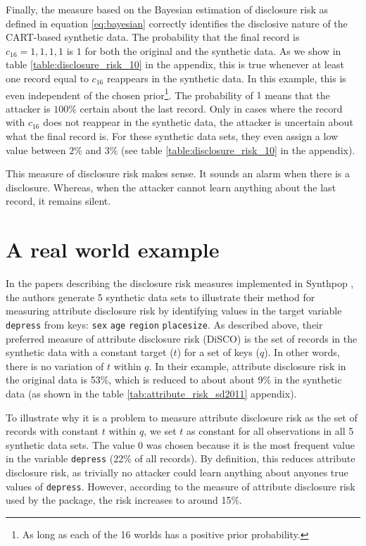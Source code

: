\documentclass[a4paper,11pt]{style/uneceart}
\begin{document}
Finally, the measure based on the Bayesian estimation of disclosure risk as defined in equation \ref{eq:bayesian} correctly identifies the disclosive nature of the CART-based synthetic data. The probability that the final record is $c_{16} = 1, 1, 1, 1$ is $1$ for both the original and the synthetic data. As we show in table \ref{table:disclosure_risk_10} in the appendix, this is true whenever at least one record equal to $c_{16}$ reappears in the synthetic data. In this example, this is even independent of the chosen prior\footnote{As long as each of the 16 worlds has a positive prior probability.}. The probability of $1$ means that the attacker is $100\%$ certain about the last record. Only in cases where the record with $c_{16}$ does not reappear in the synthetic data, the attacker is uncertain about what the final record is. For these synthetic data sets, they even assign a low value between $2\%$ and $3\%$ (see table \ref{table:disclosure_risk_10} in the appendix). 

This measure of disclosure risk makes sense. It sounds an alarm when there is a disclosure. Whereas, when the attacker cannot learn anything about the last record, it remains silent.

\section{A real world example}

In the papers describing the disclosure risk measures implemented in Synthpop \citep{raab2024privacy,raab2025practicalprivacymetricssynthetic}, the authors generate 5 synthetic data sets to illustrate their method for measuring attribute disclosure risk by identifying values in the target variable \texttt{depress} from keys: \texttt{sex} \texttt{age} \texttt{region} \texttt{placesize}.  As described above, their preferred measure of attribute disclosure risk (DiSCO) is the set of records in the synthetic data with a constant target ($t$) for a set of keys ($q$).  In other words, there is no variation of $t$ within $q$.  In their example, attribute disclosure risk in the original data is 53\%, which is reduced to about about 9\% in the synthetic data (as shown in the table \ref{tab:attribute_risk_sd2011} appendix).  

To illustrate why it is a problem to measure attribute disclosure risk as the set of records with constant $t$ within $q$, we set $t$ as constant for all observations in all 5 synthetic data sets. The value 0 was chosen because it is the most frequent value in the variable \texttt{depress} (22\% of all records).  By definition, this reduces attribute disclosure risk, as trivially no attacker could learn anything about anyones true values of \texttt{depress}.  However, according to the measure of attribute disclosure risk used by the package, the risk increases to around 15\%.
\end{document}
